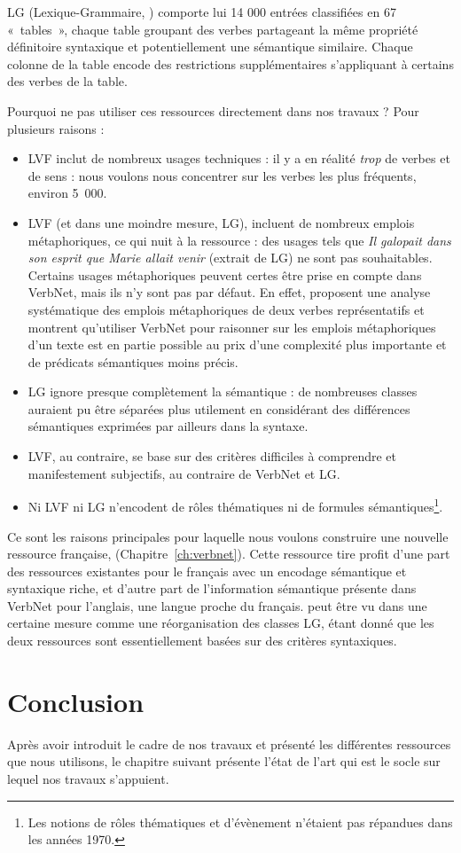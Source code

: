 
LG (Lexique-Grammaire, \cite{gross1975methodes,boons1976structure}) comporte
lui 14 000 entrées classifiées en 67 «~tables~», chaque table groupant des
verbes partageant la même propriété définitoire syntaxique et potentiellement
une sémantique similaire. Chaque colonne de la table encode des restrictions
supplémentaires s'appliquant à certains des verbes de la table.


Pourquoi ne pas utiliser ces ressources directement dans nos travaux ? Pour
plusieurs raisons :

\begin{itemize}
    \item LVF inclut de nombreux usages techniques : il y a en réalité
        \textit{trop} de verbes et de sens : nous voulons nous concentrer sur les
        verbes les plus fréquents, environ 5~000.
    \item LVF (et dans une moindre mesure, LG), incluent de nombreux emplois
        métaphoriques, ce qui nuit à la ressource : des usages tels que
        \textit{Il galopait dans son esprit que Marie allait venir} (extrait de
        LG) ne sont pas souhaitables. Certains usages métaphoriques peuvent
        certes être prise en compte dans VerbNet, mais ils n'y sont pas par
        défaut. En effet, \cite{brown2012semantic} proposent une analyse
        systématique des emplois métaphoriques de deux verbes représentatifs et
        montrent qu'utiliser VerbNet pour raisonner sur les emplois
        métaphoriques d'un texte est en partie possible au prix d'une complexité
        plus importante et de prédicats sémantiques moins précis.
    \item LG ignore presque complètement la sémantique : de nombreuses classes
        auraient pu être séparées plus utilement en considérant des différences
        sémantiques exprimées par ailleurs dans la syntaxe.
    \item LVF, au contraire, se base sur des critères difficiles à comprendre et
        manifestement subjectifs, au contraire de VerbNet et LG.
    \item Ni LVF ni LG n'encodent de rôles thématiques ni de formules
        sémantiques\footnote{Les notions de rôles thématiques et d'évènement
        n'étaient pas répandues dans les années 1970.}.
\end{itemize}

Ce sont les raisons principales pour laquelle nous voulons construire une
nouvelle ressource française, \verbenet{} (Chapitre~\ref{ch:verbnet}). Cette
ressource tire profit d'une part des ressources existantes pour le français
avec un encodage sémantique et syntaxique riche, et d'autre part de
l'information sémantique présente dans VerbNet pour l'anglais, une langue
proche du français. \verbenet{} peut être vu dans une certaine mesure comme une
réorganisation des classes LG, étant donné que les deux ressources sont
essentiellement basées sur des critères syntaxiques.

\section*{Conclusion}

Après avoir introduit le cadre de nos travaux et présenté les différentes
ressources que nous utilisons, le chapitre suivant présente l'état de l'art qui
est le socle sur lequel nos travaux s'appuient.
